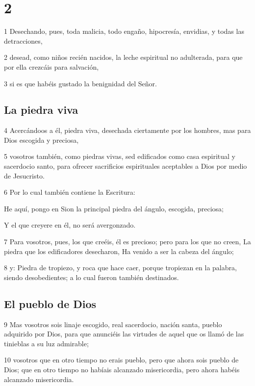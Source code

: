 \chapter{2}

\par 1 Desechando, pues, toda malicia, todo engaño, hipocresía, envidias, y todas las detracciones,
\par 2 desead, como niños recién nacidos, la leche espiritual no adulterada, para que por ella crezcáis para salvación,
\par 3 si es que habéis gustado la benignidad del Señor.

\section*{La piedra viva}

\par 4 Acercándoos a él, piedra viva, desechada ciertamente por los hombres, mas para Dios escogida y preciosa,
\par 5 vosotros también, como piedras vivas, sed edificados como casa espiritual y sacerdocio santo, para ofrecer sacrificios espirituales aceptables a Dios por medio de Jesucristo.
\par 6 Por lo cual también contiene la Escritura:
\par He aquí, pongo en Sion la principal piedra del ángulo, escogida, preciosa;
\par Y el que creyere en él, no será avergonzado.
\par 7 Para vosotros, pues, los que creéis, él es precioso; pero para los que no creen, La piedra que los edificadores desecharon, Ha venido a ser la cabeza del ángulo;
\par 8 y: Piedra de tropiezo, y roca que hace caer, porque tropiezan en la palabra, siendo desobedientes; a lo cual fueron también destinados.

\section*{El pueblo de Dios}

\par 9 Mas vosotros sois linaje escogido, real sacerdocio, nación santa, pueblo adquirido por Dios, para que anunciéis las virtudes de aquel que os llamó de las tinieblas a su luz admirable;
\par 10 vosotros que en otro tiempo no erais pueblo, pero que ahora sois pueblo de Dios; que en otro tiempo no habíais alcanzado misericordia, pero ahora habéis alcanzado misericordia.

